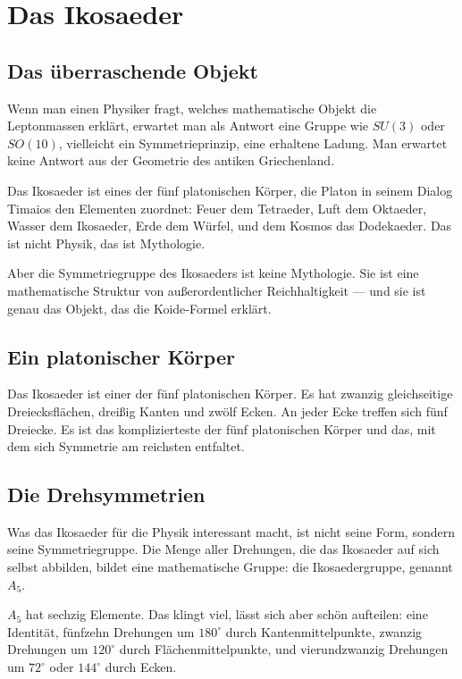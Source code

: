 \documentclass[12pt,oneside]{book}
\begin{document}
\chapter{Das Ikosaeder}

\section{Das überraschende Objekt}

Wenn man einen Physiker fragt, welches mathematische Objekt die Leptonmassen erklärt, erwartet man als Antwort eine Gruppe wie $SU(3)$ oder $SO(10)$, vielleicht ein Symmetrieprinzip, eine erhaltene Ladung. Man erwartet keine Antwort aus der Geometrie des antiken Griechenland.

Das Ikosaeder ist eines der fünf platonischen Körper, die Platon in seinem Dialog Timaios den Elementen zuordnet: Feuer dem Tetraeder, Luft dem Oktaeder, Wasser dem Ikosaeder, Erde dem Würfel, und dem Kosmos das Dodekaeder. Das ist nicht Physik, das ist Mythologie.

Aber die Symmetriegruppe des Ikosaeders ist keine Mythologie. Sie ist eine mathematische Struktur von außerordentlicher Reichhaltigkeit — und sie ist genau das Objekt, das die Koide-Formel erklärt.

\section{Ein platonischer Körper}

Das Ikosaeder ist einer der fünf platonischen Körper. Es hat zwanzig gleichseitige Dreiecksflächen, dreißig Kanten und zwölf Ecken. An jeder Ecke treffen sich fünf Dreiecke. Es ist das komplizierteste der fünf platonischen Körper und das, mit dem sich Symmetrie am reichsten entfaltet.

\section{Die Drehsymmetrien}

Was das Ikosaeder für die Physik interessant macht, ist nicht seine Form, sondern seine Symmetriegruppe. Die Menge aller Drehungen, die das Ikosaeder auf sich selbst abbilden, bildet eine mathematische Gruppe: die Ikosaedergruppe, genannt $A_5$.

$A_5$ hat sechzig Elemente. Das klingt viel, lässt sich aber schön aufteilen: eine Identität, fünfzehn Drehungen um $180^\circ$ durch Kantenmittelpunkte, zwanzig Drehungen um $120^\circ$ durch Flächenmittelpunkte, und vierundzwanzig Drehungen um $72^\circ$ oder $144^\circ$ durch Ecken.
\end{document}
